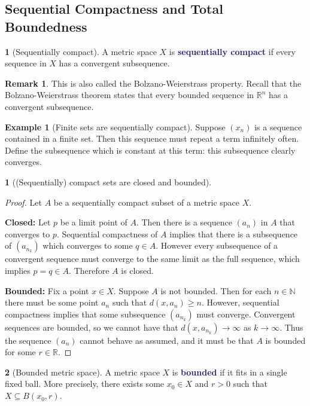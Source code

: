 \documentclass[11pt]{article}
\numberwithin{equation}{section}
\newcommand{\navy}[1]{\textcolor{MidnightBlue}{\bf #1}}
\theoremstyle{plain}
\newtheorem{theorem}{\color{ForestGreen}{\textbf{Theorem}}}[section]
\theoremstyle{definition}
\newtheorem{definition}{\color{MidnightBlue}{\textbf{Definition}}}[section]
\newtheorem{example}{\color{WildStrawberry}Example}[section]
\newtheorem*{remark}{Remark}
\newcommand{\1}{\mathbbm 1}
\newcommand{\RR}{\mathbb R}
\newcommand{\NN}{\mathbb N}
\begin{document}
\subsection{Sequential Compactness and Total Boundedness}

\begin{definition}[Sequentially compact]
	A metric space $X$ is \navy{sequentially compact} if every sequence in $X$ has a convergent subsequence. 
	\begin{remark}
	This is also called the Bolzano-Weierstrass property. Recall that the Bolzano-Weierstrass theorem states that every bounded sequence in $\RR^n$ has a convergent subsequence. 
	\end{remark}	
\end{definition}

\begin{example}[Finite sets are sequentially compact]
	Suppose $(x_n)$ is a sequence contained in a finite set. Then this sequence must repeat a term infinitely often. Define the subsequence which is constant at this term: this subsequence clearly converges. 
\end{example}

\begin{theorem}[(Sequentially) compact sets are closed and bounded]
\end{theorem}
\begin{proof}
	Let $A$ be a sequentially compact subset of a metric space $X$.

	\textbf{Closed:} Let $p$ be a limit point of $A$. Then there is a sequence $(a_n)$ in $A$ that converges to $p$. Sequential compactness of $A$ implies that there is a subsequence of $(a_{n_k})$ which converges to some $q \in A$. However every subsequence of a convergent sequence must converge to the same limit as the full sequence, which implies $p=q \in A$. Therefore $A$ is closed. 

	\textbf{Bounded:} Fix a point $x \in X$. Suppose $A$ is not bounded. Then for each $n \in \NN$ there must be some point $a_n$ such that $d(x,a_n) \geq n$. However, sequential compactness implies that some subsequence $(a_{n_k})$ must converge. Convergent sequences are bounded, so we cannot have that $d(x,a_{n_k}) \to \infty$ as $k \to \infty$. Thus the sequence $(a_n)$ cannot behave as assumed, and it must be that $A$ is bounded for some $r \in \RR$. 

\end{proof}


\begin{definition}[Bounded metric space]
	A metric space $X$ is \navy{bounded} if it fits in a single fixed ball. More precisely, there exists some $x_0 \in X$ and $r > 0$ such that $X \subseteq B(x_0,r)$. 
\end{definition}
\end{document}

